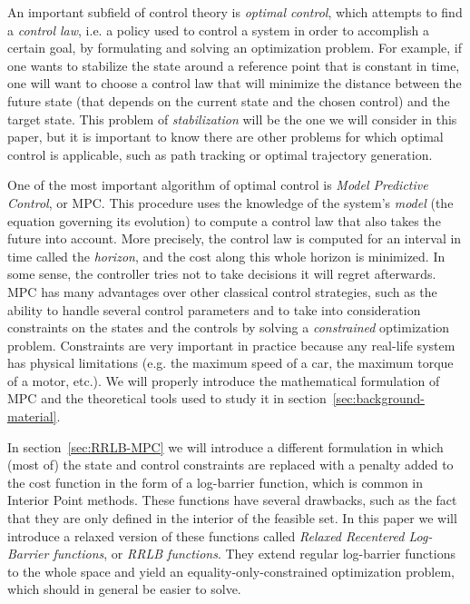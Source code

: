 \documentclass[12pt]{article}
\begin{document}
An important subfield of control theory is \textit{optimal control}, which attempts to find a \textit{control law}, i.e. a policy used to control a system in order to accomplish a certain goal, by formulating and solving an optimization problem.
For example, if one wants to stabilize the state around a reference point that is constant in time, one will want to choose a control law that will minimize the distance between the future state (that depends on the current state and the chosen control) and the target state.
This problem of \textit{stabilization} will be the one we will consider in this paper, but it is important to know there are other problems for which optimal control is applicable, such as path tracking or optimal trajectory generation.

One of the most important algorithm of optimal control is \textit{Model Predictive Control}, or MPC.
This procedure uses the knowledge of the system's \textit{model} (the equation governing its evolution) to compute a control law that also takes the future into account.
More precisely, the control law is computed for an interval in time called the \textit{horizon}, and the cost along this whole horizon is minimized.
In some sense, the controller tries not to take decisions it will regret afterwards.
MPC has many advantages over other classical control strategies, such as the ability to handle several control parameters and to take into consideration constraints on the states and the controls by solving a \textit{constrained} optimization problem.
Constraints are very important in practice because any real-life system has physical limitations (e.g. the maximum speed of a car, the maximum torque of a motor, etc.).
We will properly introduce the mathematical formulation of MPC and the theoretical tools used to study it in section~\ref{sec:background-material}.

In section~\ref{sec:RRLB-MPC} we will introduce a different formulation in which (most of) the state and control constraints are replaced with a penalty added to the cost function in the form of a log-barrier function, which is common in Interior Point methods.
These functions have several drawbacks, such as the fact that they are only defined in the interior of the feasible set.
In this paper we will introduce a relaxed version of these functions called \textit{Relaxed Recentered Log-Barrier functions}, or \textit{RRLB functions}.
They extend regular log-barrier functions to the whole space and yield an equality-only-constrained optimization problem, which should in general be easier to solve.
\end{document}
